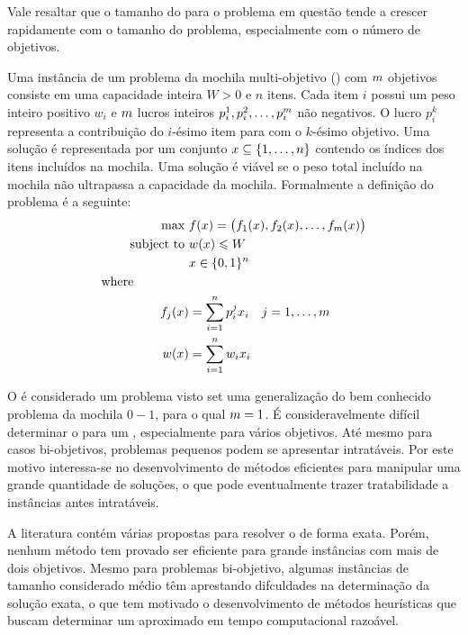 Vale resaltar que o tamanho do \paretoset para o problema em questão
tende a crescer rapidamente com o tamanho do problema, especialmente com o
número de objetivos.

Uma instância de um problema da mochila multi-objetivo (\mokp{}) com $m$
objetivos consiste em uma capacidade inteira $W >0$ e $n$ itens.
Cada item $i$ possui um peso inteiro positivo $w_i$ e $m$ lucros inteiros
$p_i^1, p_i^2, \ldots, p_{i}^{m}$ não negativos.
O lucro $p_i^k$ representa a contribuição do $i$-ésimo item
para com o $k$-ésimo objetivo.
Uma solução é representada por um conjunto $x \subseteq \{1, \ldots, n\}$
contendo os índices dos itens incluídos na mochila.
Uma solução é viável se o peso total incluído na mochila não ultrapassa
a capacidade da mochila.
Formalmente a definição do problema é a seguinte:
\begin{align*}
  \text{max   } & f(x) =
    \big(f_1(x) ,f_2(x) ,\ldots ,f_{m}(x)\big) \\
  \text{subject to   } & w(x) \leqslant W \\
  & x \in \{0, 1\}^n\\
  \text{where} \phantom{mmmmm} \\
  f_j(x) &= \sum_{i = 1}^n p^j_i x_i \quad j = 1, \ldots, m\\
  w(x) &= \sum_{i = 1}^n w_i x_i
\end{align*}

O \mokp{} é considerado um problema \nphard{} visto set uma generalização
do bem conhecido problema da mochila $0-1$, para o qual $m = 1$.
É consideravelmente difícil determinar o \paretoset para um \mokp{},
especialmente para vários objetivos.
Até mesmo para casos bi-objetivos, problemas pequenos podem se apresentar
intratáveis.
Por este motivo interessa-se no desenvolvimento de métodos eficientes
para manipular uma grande quantidade de soluções, o que pode eventualmente
trazer tratabilidade a instâncias antes intratáveis.

A literatura contém várias propostas para resolver o \mokp{} de forma exata.
Porém, nenhum método tem provado ser eficiente para grande instâncias
com mais de dois objetivos.
Mesmo para problemas bi-objetivo, algumas instâncias de tamanho considerado
médio têm aprestando difculdades na determinação da solução exata, o que
tem motivado o desenvolvimento de métodos heurísticas que buscam determinar
um \paretoset aproximado em tempo computacional razoável.

